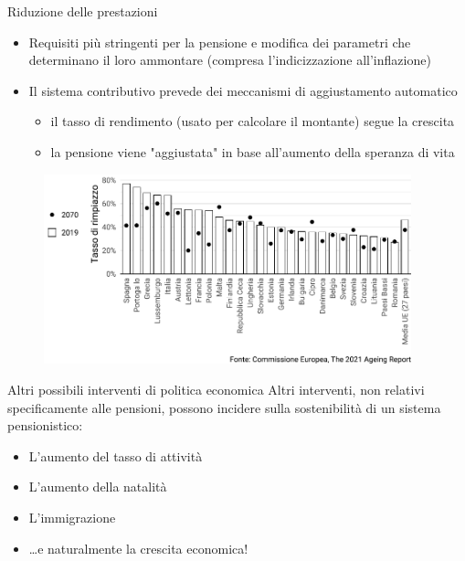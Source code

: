 \documentclass[aspectratio=64,11pt]{beamer}
\begin{document}
\begin{frame}{Riduzione delle prestazioni}
\begin{itemize}
\item Requisiti più stringenti per la pensione e modifica dei parametri che
determinano il loro ammontare (compresa l'indicizzazione all'inflazione)
\item Il sistema contributivo prevede dei meccanismi di aggiustamento automatico
\begin{itemize}
\item il tasso di rendimento (usato per calcolare il montante) segue la crescita
\item la pensione viene "aggiustata" in base all'aumento della speranza di vita
\end{itemize}
\end{itemize}

\begin{figure}[htbp]
\centering
\includegraphics[height=5.5cm]{./figure/tassi-rimpiazzo-2019-2070.pdf}
\end{figure}
\end{frame}

\begin{frame}{Altri possibili interventi di politica economica}
Altri interventi, non relativi specificamente alle pensioni, possono incidere sulla sostenibilità di un sistema pensionistico: 
\begin{itemize}
\item L'aumento del tasso di attività
\item L'aumento della natalità
\item L'immigrazione
\item \ldots{}e naturalmente la crescita economica!
\end{itemize}
\end{frame}
\end{document}
